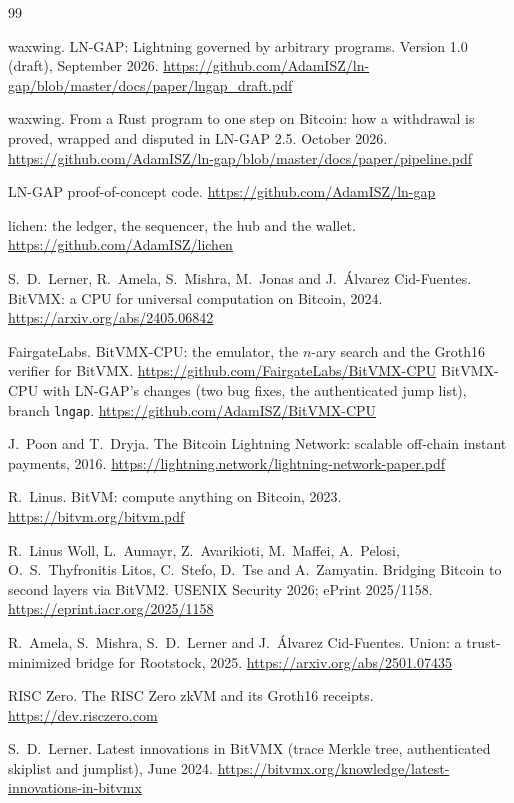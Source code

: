 \documentclass[11pt]{article}
\begin{document}
\begin{thebibliography}{99}

 waxwing. LN-GAP: Lightning governed by arbitrary programs. Version 1.0 (draft), September 2026. \url{https://github.com/AdamISZ/ln-gap/blob/master/docs/paper/lngap_draft.pdf}

 waxwing. From a Rust program to one step on Bitcoin: how a withdrawal is proved, wrapped and disputed in LN-GAP 2.5. October 2026. \url{https://github.com/AdamISZ/ln-gap/blob/master/docs/paper/pipeline.pdf}

 LN-GAP proof-of-concept code. \url{https://github.com/AdamISZ/ln-gap}

 lichen: the ledger, the sequencer, the hub and the wallet. \url{https://github.com/AdamISZ/lichen}

 S.~D.~Lerner, R.~Amela, S.~Mishra, M.~Jonas and J.~\'Alvarez Cid-Fuentes. BitVMX: a CPU for universal computation on Bitcoin, 2024. \url{https://arxiv.org/abs/2405.06842}

 FairgateLabs. BitVMX-CPU: the emulator, the $n$-ary search and the Groth16 verifier for BitVMX. \url{https://github.com/FairgateLabs/BitVMX-CPU}
 BitVMX-CPU with LN-GAP's changes (two bug fixes, the authenticated jump list), branch \texttt{lngap}. \url{https://github.com/AdamISZ/BitVMX-CPU}

 J.~Poon and T.~Dryja. The Bitcoin Lightning Network: scalable off-chain instant payments, 2016. \url{https://lightning.network/lightning-network-paper.pdf}

 R.~Linus. BitVM: compute anything on Bitcoin, 2023. \url{https://bitvm.org/bitvm.pdf}

 R.~Linus Woll, L.~Aumayr, Z.~Avarikioti, M.~Maffei, A.~Pelosi, O.~S.~Thyfronitis Litos, C.~Stefo, D.~Tse and A.~Zamyatin. Bridging Bitcoin to second layers via BitVM2. USENIX Security 2026; ePrint 2025/1158. \url{https://eprint.iacr.org/2025/1158}

 R.~Amela, S.~Mishra, S.~D.~Lerner and J.~\'Alvarez Cid-Fuentes. Union: a trust-minimized bridge for Rootstock, 2025. \url{https://arxiv.org/abs/2501.07435}

 RISC Zero. The RISC Zero zkVM and its Groth16 receipts. \url{https://dev.risczero.com}

 S.~D.~Lerner. Latest innovations in BitVMX (trace Merkle tree, authenticated skiplist and jumplist), June 2024. \url{https://bitvmx.org/knowledge/latest-innovations-in-bitvmx}


\end{thebibliography}
\end{document}
